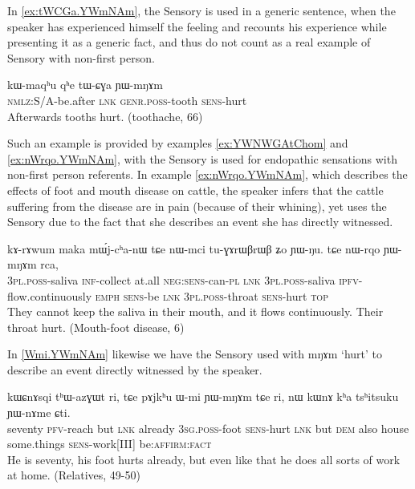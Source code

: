 \documentclass[oldfontcommands,oneside,a4paper,11pt]{article}
\newcommand{\ipa}[1]{{\phon \mbox{#1}}} %
\newcommand{\factual}[1]{\textsc{:fact}}
\begin{document}
In \ref{ex:tWCGa.YWmNAm}, the Sensory is used in a generic sentence, when the speaker has experienced himself the feeling and recounts his experience while presenting it as a generic fact, and thus do not count as a real example of Sensory with non-first person.

\begin{exe}
\ex \label{ex:tWCGa.YWmNAm}
\gll
\ipa{kɯ-maqʰu}  	\ipa{qʰe}  	\ipa{tɯ-ɕɣa}  	\ipa{ɲɯ-mŋɤm}  \\
\textsc{nmlz}:S/A-be.after \textsc{lnk} \textsc{genr.poss}-tooth \textsc{sens}-hurt \\
\glt Afterwards tooths hurt. (toothache, 66)
\end{exe}

Such an example is provided by examples \ref{ex:YWNWGAtChom} and \ref{ex:nWrqo.YWmNAm},  with the Sensory is used for endopathic sensations with non-first person referents. In example \ref{ex:nWrqo.YWmNAm}, which describes the effects of foot and mouth disease on cattle, the speaker  infers that the cattle suffering from the disease are in pain (because of their whining), yet uses the Sensory due to the fact that she describes an event she has directly witnessed. 

\begin{exe}
\ex \label{ex:nWrqo.YWmNAm}
\gll \ipa{nɯ-mci} 	\ipa{kɤ-rɤwum} 	\ipa{maka} 	\ipa{mɯ́j-cʰa-nɯ} 	\ipa{tɕe} 	\ipa{nɯ-mci} 	\ipa{tu-ɣɤrɯβrɯβ} 	\ipa{ʑo} 	\ipa{ɲɯ-ŋu.}  
\ipa{tɕe} 	\ipa{nɯ-rqo} 	\ipa{ɲɯ-mŋɤm} 	\ipa{rca,} \\
\textsc{3pl.poss}-saliva \textsc{inf}-collect at.all \textsc{neg:sens}-can-\textsc{pl} \textsc{lnk} \textsc{3pl.poss}-saliva \textsc{ipfv}-flow.continuously \textsc{emph} \textsc{sens}-be \textsc{lnk} \textsc{3pl.poss}-throat \textsc{sens}-hurt \textsc{top}  \\
\glt They cannot keep the saliva in their mouth, and it flows continuously. Their throat hurt. (Mouth-foot disease, 6)
\end{exe}

In \ref{Wmi.YWmNAm} likewise we have the Sensory used with \ipa{mŋɤm} `hurt' to describe an event directly witnessed by the speaker.

\begin{exe}
\ex \label{Wmi.YWmNAm}
\gll
\ipa{kɯɕnɤsqi} 	\ipa{tʰɯ-azɣɯt} 	\ipa{ri,} \ipa{tɕe} 	\ipa{pɤjkʰu} 	\ipa{ɯ-mi} 	\ipa{ɲɯ-mŋɤm} 	\ipa{tɕe} 	\ipa{ri,} 	\ipa{nɯ} 	\ipa{kɯnɤ} 	\ipa{kʰa} 	\ipa{tsʰitsuku} 	\ipa{ɲɯ-nɤme} 	\ipa{ɕti.} \\
seventy \textsc{pfv}-reach but \textsc{lnk} already \textsc{3sg.poss}-foot \textsc{sens}-hurt \textsc{lnk} but \textsc{dem} also house some.things \textsc{sens}-work[III] be:\textsc{affirm}\factual{} \\
\glt He is seventy, his foot hurts already, but even like that he does all sorts of work at home. (Relatives, 49-50)
\end{exe}
\end{document}
